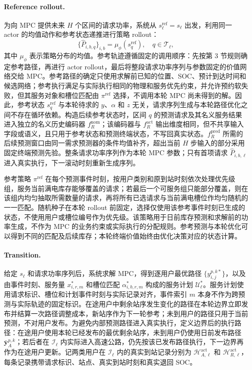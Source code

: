 \documentclass[12pt,a4paper,UTF8]{ctexart}
\begin{document}
\paragraph{Reference rollout.}
为向 MPC 提供未来 $H$ 个区间的请求功率，系统从
$s_{\ell}^{\mathrm{ref}}=s_\ell$ 出发，利用同一 actor 的均值动作和参考状态递推进行策略 rollout：
\begin{equation}
\{\widehat P_{i,b,q}\}_{i,b}
=
\mu_\phi(s_{q}^{\mathrm{ref}}),
\quad q\in\mathcal T_\ell,
\label{eq:rl_power_rollout}
\end{equation}
其中 $\mu_\phi$ 表示策略分布的均值。参考轨迹遵循固定的调用顺序：先按第 3 节规则确定参考路径，再进行 actor rollout，最后将整段请求功率序列与参数固定的价值网络交给 MPC。参考路径的确定只使用求解前已知的位置、SOC、预计到达时间和候选网络；参考执行满足与实际执行相同的物理和服务优先约束，并允许预约软失败，但其服务对象和槽位匹配由 $\pi^{\mathrm{ref}}$ 选择，不调用本轮 MPC 尚未得到的解。因此，参考状态 $s_q^{\mathrm{ref}}$ 与本轮待求的 $y$、$\alpha$ 和 $z$ 无关，请求序列生成与本轮路径优化之间不存在循环依赖。构造后续参考状态时，区间 $q$ 的预测请求及其名义服务结果进入独立的名义历史编码器 $f_R^{\mathrm{nom}}$；该编码器与 $f_R^{\mathrm{act}}$ 输出维度相同，但不共享输入字段或语义，且只用于参考状态和预测终端状态，不写回真实状态。$f_R^{\mathrm{pred}}$ 所需的后续预测窗口由同一需求预测器的条件均值补齐，超出当前 $H$ 步输入的部分采用固定终端预测先验。整条请求功率序列作为本轮 MPC 参数；只有首项请求 $\widehat P_{i,b,\ell}$ 进入真实执行，下一滚动时刻重新生成序列。

参考策略 $\pi^{\mathrm{ref}}$ 在每个预测事件时刻，按用户类别和原到站时刻依次处理优先级组，服务当前满电库存能够覆盖的请求；若最后一个可服务组只能部分覆盖，则在该组内均匀抽取所需数量的请求，再将所有已选请求与当前满电槽位作均匀随机的一一匹配。随机种子在本轮 rollout 前固定，选择仅使用该参考事件时刻已生成的状态，不使用用户或槽位编号作为优先级。该策略用于日前库存预测和求解前的功率生成，不作为 MPC 的业务约束或实际执行的分配规则。参考预测与本轮优化可以得到不同的匹配及后续库存；本轮终端价值始终由优化决策对应的状态计算。

\paragraph{Transition.}
给定 $s_\ell$ 和请求功率序列后，系统求解 MPC，得到逐用户最优路径 $\{y_{i,j}^{p,k*}\}$，以及由事件时刻、服务量 $x_{i,r,m}^*$ 和槽位匹配 $\alpha_{i,b,r,m}^*$ 构成的服务计划 $\mathcal U_\ell^*$。服务计划使用请求标识、槽位和计划事件时刻与实际记录对齐，事件索引 $m$ 本身不作为跨预测与实际轨迹的固定标识。在途用户中剩余站序发生变化的路径在本轮边界立即发布并结算一次路径调整成本，新站序作为下一轮参考；未到用户的路径只用于当前预测，不对用户发布。为避免内部预测路径进入真实执行，定义边界后的执行路径：在途用户使用本轮已经发布的最优剩余站序，未到用户仍使用日前发布路径 $\bar{\mathbf y}_{A}^{p,k}$；若后者在 $\mathcal I_\ell$ 内实际进入高速公路，仍先按该已发布路径执行，下一边界再作为在途用户更新。记两类用户在 $\mathcal I_\ell$ 内的真实到站记录分别为 $\mathcal H_{A,\ell}^{\mathrm{act}}$ 和 $\mathcal H_{R,\ell}^{\mathrm{act}}$，每条记录携带请求标识、站点、真实到站时刻和真实退回 SOC。
\end{document}
